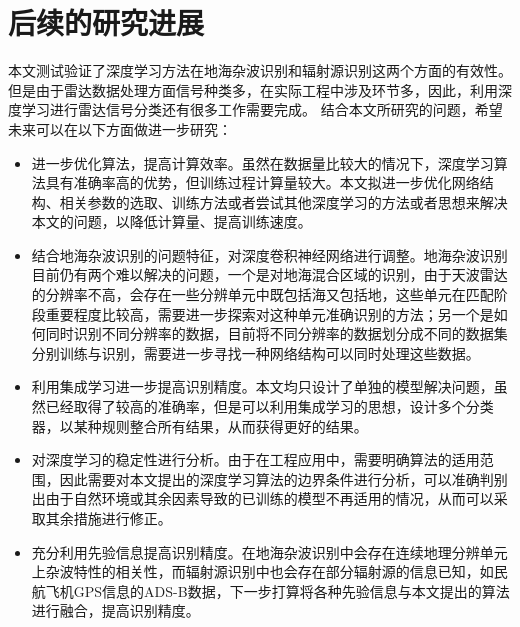 \section{后续的研究进展}
本文测试验证了深度学习方法在地海杂波识别和辐射源识别这两个方面的有效性。但是由于雷达数据处理方面信号种类多，在实际工程中涉及环节多，因此，利用深度学习进行雷达信号分类还有很多工作需要完成。
结合本文所研究的问题，希望未来可以在以下方面做进一步研究：
\begin{itemize}
\item 进一步优化算法，提高计算效率。虽然在数据量比较大的情况下，深度学习算法具有准确率高的优势，但训练过程计算量较大。本文拟进一步优化网络结构、相关参数的选取、训练方法或者尝试其他深度学习的方法或者思想来解决本文的问题，以降低计算量、提高训练速度。
\item 结合地海杂波识别的问题特征，对深度卷积神经网络进行调整。地海杂波识别目前仍有两个难以解决的问题，一个是对地海混合区域的识别，由于天波雷达的分辨率不高，会存在一些分辨单元中既包括海又包括地，这些单元在匹配阶段重要程度比较高，需要进一步探索对这种单元准确识别的方法；另一个是如何同时识别不同分辨率的数据，目前将不同分辨率的数据划分成不同的数据集分别训练与识别，需要进一步寻找一种网络结构可以同时处理这些数据。
\item 利用集成学习进一步提高识别精度。本文均只设计了单独的模型解决问题，虽然已经取得了较高的准确率，但是可以利用集成学习的思想，设计多个分类器，以某种规则整合所有结果，从而获得更好的结果。
\item 对深度学习的稳定性进行分析。由于在工程应用中，需要明确算法的适用范围，因此需要对本文提出的深度学习算法的边界条件进行分析，可以准确判别出由于自然环境或其余因素导致的已训练的模型不再适用的情况，从而可以采取其余措施进行修正。
\item 充分利用先验信息提高识别精度。在地海杂波识别中会存在连续地理分辨单元上杂波特性的相关性，而辐射源识别中也会存在部分辐射源的信息已知，如民航飞机GPS信息的ADS-B数据，下一步打算将各种先验信息与本文提出的算法进行融合，提高识别精度。

\end{itemize}
